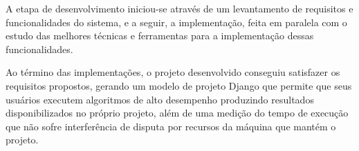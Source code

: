 \documentclass[tg]{mdtufsm}
\begin{document}
A etapa de desenvolvimento iniciou-se através de um levantamento de requisitos e funcionalidades do sistema, e a seguir, a implementação, feita em paralela com o estudo das melhores técnicas e ferramentas para a implementação dessas funcionalidades. 

Ao término das implementações, o projeto desenvolvido conseguiu satisfazer os requisitos propostos, gerando um modelo de projeto Django que permite que seus usuários executem algoritmos de alto desempenho produzindo resultados disponibilizados no próprio projeto, além de uma medição do tempo de execução que não sofre interferência de disputa por recursos da máquina que mantém o projeto.


\setlength{\baselineskip}{\baselineskip}


\end{document}
